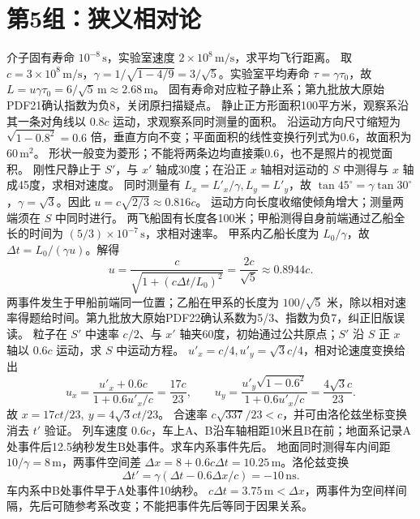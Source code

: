 \section{第5组：狭义相对论}
\problemtext 介子固有寿命 $10^{-8}\,\mathrm s$，实验室速度 $2\times10^8\,\mathrm{m/s}$，求平均飞行距离。
\workings 取 $c=3\times10^8\,\mathrm{m/s}$，$\gamma=1/\sqrt{1-4/9}=3/\sqrt5$。实验室平均寿命 $\tau=\gamma\tau_0$，故 $L=u\gamma\tau_0=6/\sqrt5\,\mathrm m\approx2.68\,\mathrm m$。
\crosscheck 固有寿命对应粒子静止系；第九批放大原始PDF21确认指数为负8，关闭原扫描疑点。
\problemtext 静止正方形面积100平方米，观察系沿其一条对角线以 $0.8c$ 运动，求观察系同时测量的面积。
\workings 沿运动方向尺寸缩短为 $\sqrt{1-0.8^2}=0.6$ 倍，垂直方向不变；平面面积的线性变换行列式为0.6，故面积为 $60\,\mathrm{m^2}$。
\crosscheck 形状一般变为菱形；不能将两条边均直接乘0.6，也不是照片的视觉面积。
\problemtext 刚性尺静止于 $S'$，与 $x'$ 轴成30度；在沿正 $x$ 轴相对运动的 $S$ 中测得与 $x$ 轴成45度，求相对速度。
\workings 同时测量有 $L_x=L'_x/\gamma,L_y=L'_y$，故 $\tan45^\circ=\gamma\tan30^\circ$，$\gamma=\sqrt3$。因此 $u=c\sqrt{2/3}\approx0.816c$。
\crosscheck 运动方向长度收缩使倾角增大；测量两端须在 $S$ 中同时进行。
\problemtext 两飞船固有长度各100米；甲船测得自身前端通过乙船全长的时间为 $(5/3)\times10^{-7}\,\mathrm s$，求相对速率。
\workings 甲系内乙船长度为 $L_0/\gamma$，故 $\Delta t=L_0/(\gamma u)$。解得
\[
u=\frac{c}{\sqrt{1+(c\Delta t/L_0)^2}}=\frac{2c}{\sqrt5}\approx0.8944c.
\]
\crosscheck 两事件发生于甲船前端同一位置；乙船在甲系的长度为 $100/\sqrt5$ 米，除以相对速率得题给时间。第九批放大原始PDF22确认系数为5/3、指数为负7，纠正旧版误读。
\problemtext 粒子在 $S'$ 中速率 $c/2$、与 $x'$ 轴夹60度，初始通过公共原点；$S'$ 沿 $S$ 正 $x$ 轴以 $0.6c$ 运动，求 $S$ 中运动方程。
\workings $u'_x=c/4,u'_y=\sqrt3c/4$，相对论速度变换给出
\[
u_x=\frac{u'_x+0.6c}{1+0.6u'_x/c}=\frac{17c}{23},\qquad
u_y=\frac{u'_y\sqrt{1-0.6^2}}{1+0.6u'_x/c}=\frac{4\sqrt3c}{23}.
\]
故 $x=17ct/23,\ y=4\sqrt3ct/23$。
\crosscheck 合速率 $c\sqrt{337}/23<c$，并可由洛伦兹坐标变换消去 $t'$ 验证。
\problemtext 列车速度 $0.6c$，车上A、B沿车轴相距10米且B在前；地面系记录A处事件后12.5纳秒发生B处事件。求车内系事件先后。
\workings 地面同时测得车内间距 $10/\gamma=8\,\mathrm m$，两事件空间差 $\Delta x=8+0.6c\Delta t=10.25\,\mathrm m$。洛伦兹变换
\[
\Delta t'=\gamma(\Delta t-0.6\Delta x/c)=-10\,\mathrm{ns}.
\]
车内系中B处事件早于A处事件10纳秒。
\crosscheck $c\Delta t=3.75\,\mathrm m<\Delta x$，两事件为空间样间隔，先后可随参考系改变；不能把事件先后等同于因果关系。

